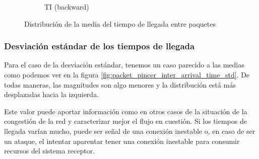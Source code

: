 \begin{figure}[H]
\begin{subfigure}[b]{0.32\textwidth}
        \caption{TI (backward)}
    \end{subfigure}
    \hfill
       \caption{Distribución de la media del tiempo de llegada entre paquetes}
       \label{fig:packet_pincer_inter_arrival_time_mean}
\end{figure}

\subsubsection{Desviación estándar de los tiempos de llegada}

Para el caso de la desviación estándar, tenemos un caso parecido a las medias como podemos ver en la figura \ref{fig:packet_pincer_inter_arrival_time_std}. De todas maneras, las magnitudes son algo menores y la distribución está más desplazadas hacia la izquierda. 

Este valor puede aportar información como en otros casos de la situación de la congestión de la red y caracterizar mejor el flujo en cuestión. Si los tiempos de llegada varían mucho, puede ser señal de una conexión inestable o, en caso de ser un ataque, el intentar aparentar tener una conexión inestable para consumir recursos del sistema receptor.

